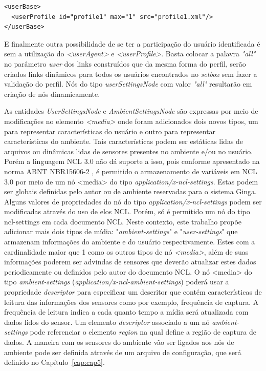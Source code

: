 \begin{lstlisting}[language=ncl,label=lst:userProfile, caption={Definição de características de mais de um usuário de perfil diferente participante da aplicação}]
<userBase>
  <userProfile id="profile1" max="1" src="profile1.xml"/>
</userBase>
\end{lstlisting}

E finalmente outra possibilidade de se ter a participação do usuário identificada é sem a utilização do \textit{<userAgent>} e \textit{<userProfile>}. Basta colocar a palavra \textit{"all"} no parâmetro \textit{user} dos links construídos que da mesma forma do perfil, serão criados links dinâmicos para todos os usuários encontrados no \textit{setbox} sem fazer a validação do perfil.  Nós do tipo \textit{userSettingsNode} com valor \textit{"all"} resultarão em criação de nós dinamicamente.

As entidades \textit{UserSettingsNode} e \textit{AmbientSettingsNode} são expressas por meio de modificações no elemento \textit{<media>} onde foram adicionados dois novos tipos, um para representar características do usuário e outro para representar características do ambiente. Tais características podem ser estáticas lidas de arquivos ou dinâmicas lidas de sensores presentes no ambiente e/ou no usuário. Porém a linguagem NCL 3.0 não dá suporte a isso, pois conforme apresentado na norma ABNT NBR15606-2 \cite{ABNT:2011aa}, é permitido o armazenamento de variáveis em NCL 3.0 por meio de um nó <media> do tipo \textit{application/x-ncl-settings}. Estas podem ser globais definidas pelo autor ou de ambiente reservadas para o sistema Ginga. Alguns valores de propriedades do nó do tipo \textit{application/x-ncl-settings} podem ser modificadas através do uso de elos NCL.  Porém, só é permitido um nó do tipo ncl-settings em cada documento NCL. Neste contexto, este trabalho propõe adicionar mais dois tipos de mídia: "\textit{ambient-settings}" e "\textit{user-settings}" que  armazenam informações do ambiente e do usuário respectivamente. Estes com a cardinalidade maior que 1 como os outros tipos de nó \textit{<media>}, além de suas informações poderem ser advindas de sensores que deverão atualizar estes dados periodicamente ou definidos pelo autor do documento NCL. O nó <media> do tipo \textit{ambient-settings} (\textit{application/x-ncl-ambient-settings}) poderá usar a propriedade \textit{descriptor} para especificar um descritor que contém características de leitura das informações dos sensores como por exemplo, frequência de captura. A frequência de leitura indica a cada quanto tempo a mídia será atualizada com dados lidos do sensor.
Um elemento \textit{descriptor} associado a um nó \textit{ambient-settings} pode referenciar o elemento \textit{region} na qual define a região de captura de dados. A maneira com os sensores do ambiente vão ser ligados aos nós de ambiente pode ser definida através de um arquivo de configuração, que será definido no Capítulo~\ref{cap:cap5}.

